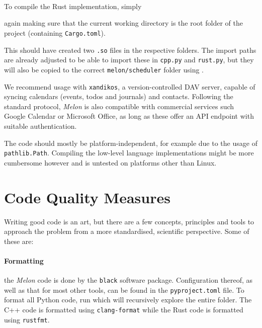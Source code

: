 \documentclass{prettytex/ox/mmsc-special-topic}
\begin{document}
   \\
   \\
   \\

  To compile the Rust implementation, simply


  again making sure that the current working directory is the root folder of the project (containing \texttt{Cargo.toml}).

  This should have created two \texttt{.so} files in the respective folders.
  The import paths are already adjusted to be able to import these in \texttt{cpp.py} and \texttt{rust.py}, but they will also be copied to the correct \texttt{melon/scheduler} folder using .

  We recommend usage with \texttt{xandikos}, a version-controlled DAV server, capable of syncing calendars (events, todos and journals) and contacts.
  Following the standard protocol, \textit{Melon} is also compatible with commercial services such Google Calendar or Microsoft Office, as long as these offer an API endpoint with suitable authentication.

  The code should mostly be platform-independent, for example due to the usage of \texttt{pathlib.Path}. Compiling the low-level language implementations might be more cumbersome however and is untested on platforms other than Linux.

  \pagebreak
  \section{Code Quality Measures}
  Writing good code is an art, but there are a few concepts, principles and tools to approach the problem from a more standardised, scientific perspective.
  Some of these are:

  \paragraph{Formatting} the \textit{Melon} code is done by the \texttt{black} software package. Configuration thereof, as well as that for most other tools, can be found in the \texttt{pyproject.toml} file. To format all Python code, run  which will recursively explore the entire folder. The C++ code is formatted using \texttt{clang-format} while the Rust code is formatted using \texttt{rustfmt}.
\end{document}
